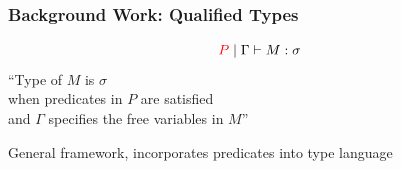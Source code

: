 


\begin{frame}[c]
  \frametitle{Background Work: Qualified Types}
  \begin{center}
    {\LARGE   $${\color{red}P} \mid \Gamma \vdash M:\sigma $$}
``Type of $M$ is $\sigma$\\
  when predicates in $P$ are satisfied\\
  and $\Gamma$ specifies the free variables in $M$''\cite{jones_theory_1994}

  General framework, incorporates predicates into type language
  \end{center}
\end{frame}

